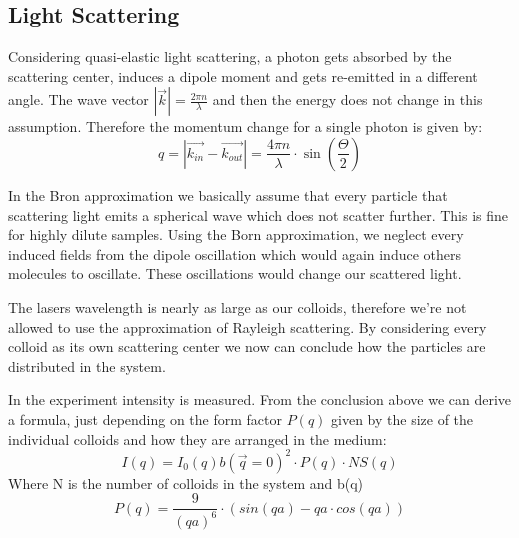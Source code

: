 \documentclass[]{article}
\begin{document}
\subsection{Light Scattering}
Considering quasi-elastic light scattering, a photon gets absorbed by the scattering center, induces a dipole moment and gets re-emitted in a different angle. The wave vector $ |\vec{k}| = \frac{2\pi n}{\lambda}$ and then the energy does not change in this assumption. Therefore the momentum change for a single photon is given by:
\begin{equation}\label{eq:momentum}
q= |\vec{k_{in}} - \vec{k_{out}}| = \frac{4\pi n}{\lambda} \cdot \sin \left( \dfrac{\Theta}{2} \right)  
\end{equation}

In the Bron approximation we basically assume that every particle that scattering light emits a spherical wave which does not scatter further. This is fine for highly dilute samples.
Using the Born approximation, we neglect every induced fields from the dipole oscillation which would again induce others molecules to oscillate. These oscillations would change our scattered light.


	
The lasers wavelength is nearly as large as our colloids, therefore we're not allowed to use the approximation of Rayleigh scattering. By considering every colloid as its own scattering center we now can conclude how the particles are distributed in the system.

In the experiment intensity is measured. From the conclusion above we can derive a formula, just depending on the form factor $P(q)$ given by the size of the individual colloids and how they are arranged in the medium:
\begin{equation} \label{eq:intensity}
I(q) = I_0(q)b(\vec{q}=0)^2 \cdot P(q) \cdot NS(q)
\end{equation}
Where N is the number of colloids in the system and b(q) 
\\

\begin{equation}\label{eq:form}
P(q)= \frac{9}{(qa)^6} \cdot (sin(qa) - qa \cdot cos(qa))
\end{equation}
\end{document}
